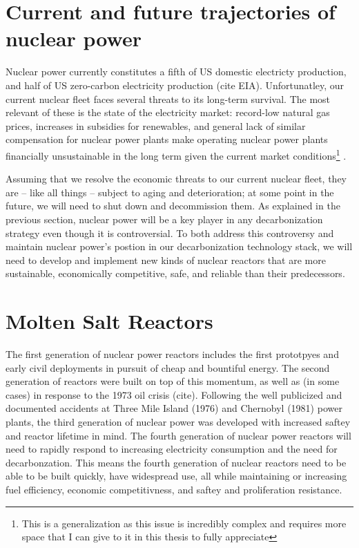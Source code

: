 \section{Current and future trajectories of nuclear power}%
\label{sec:current_and_future_trajectories_of_nuclear_power}
Nuclear power currently constitutes a fifth of US domestic electricty production, and half of US zero-carbon electricity production (cite EIA). Unfortunatley, our current nuclear fleet faces several threats to its long-term survival. The most relevant of these is the state of the electricity market: record-low natural gas prices, increases in subsidies for renewables, and general lack of similar compensation for
nuclear power plants make operating nuclear power plants financially unsustainable in the long term given the current market conditions\footnote{This is a generalization as this issue is incredibly complex and requires more space that I can give to it in this thesis to fully appreciate} \cite{szilard_economic_2016}. %

Assuming that we resolve the economic threats to our current nuclear fleet, they are -- like all things -- subject to aging and deterioration; at some point in the future, we will need to shut down and decommission them. As explained in the previous section, nuclear power will be a key player in any decarbonization strategy even though it is controversial. To both address this controversy and maintain nuclear power's postion in our decarbonization technology stack, we will need to develop and
implement new kinds of nuclear reactors that are more sustainable, economically competitive, safe, and reliable than
their predecessors.
 
\section{Molten Salt Reactors}%
\label{sec:molten_salt_reactors}

The first generation of nuclear power reactors includes the first prototpyes and early civil deployments in pursuit of cheap and bountiful energy. The second generation of reactors were built on top of this momentum, as well as (in some cases) in response to the 1973 oil crisis (cite). Following the well publicized and documented accidents at Three Mile Island (1976) and Chernobyl (1981) power plants, the third generation of nuclear power was developed with increased saftey and reactor lifetime
in mind. The fourth generation of nuclear power
reactors will need to rapidly respond to increasing electricity consumption and the need for decarbonzation. This means the fourth generation of nuclear reactors need to be able to be built quickly, have widespread use, all while maintaining or increasing fuel efficiency, economic competitivness, and saftey and proliferation resistance.

